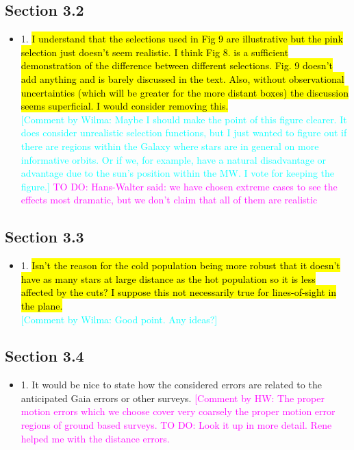 \documentclass[10pt,a4paper]{article}
\newcommand{\Wilma}[1]{\textcolor{Magenta}{#1}}
\newcommand{\HW}[1]{\textcolor{Cyan}{#1}}
\begin{document}
\subsection{Section 3.2}
\begin{itemize}
\item 1. \hl{I understand that the selections used in Fig 9 are illustrative but the pink selection just doesn't seem realistic. I think Fig 8. is a sufficient demonstration of the difference between different selections. Fig. 9 doesn't add anything and is barely discussed in the text. Also, without observational uncertainties (which will be greater for the more distant boxes) the discussion seems superficial. I would consider removing this.}\\
\HW{[Comment by Wilma: Maybe I should make the point of this figure clearer. It does consider unrealistic selection functions, but I just wanted to figure out if there are regions within the Galaxy where stars are in general on more informative orbits. Or if we, for example, have a natural disadvantage or advantage due to the sun's position within the MW. I vote for keeping the figure.] \Wilma{TO DO: Hans-Walter said: we have chosen extreme cases to see the effects most dramatic, but we don't claim that all of them are realistic}}
\end{itemize}

\subsection{Section 3.3}
\begin{itemize}
\item 1. \hl{Isn't the reason for the cold population being more robust that it doesn't have as many stars at large distance as the hot population so it is less affected by the cuts? I suppose this not necessarily true for lines-of-sight in the plane.}\\
\HW{[Comment by Wilma: Good point. Any ideas?]}
\end{itemize}

\subsection{Section 3.4}
\begin{itemize}
\item 1. It would be nice to state how the considered errors are related to the anticipated Gaia errors or other surveys. \Wilma{[Comment by HW: The proper motion errors which we choose cover very coarsely the proper motion error regions of ground based surveys. TO DO: Look it up in more detail. Rene helped me with the distance errors.}
\end{itemize}
\end{document}

